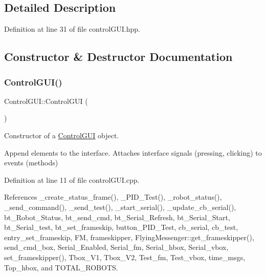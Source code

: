 \subsection{Detailed Description}


Definition at line 31 of file control\+G\+U\+I.\+hpp.



\subsection{Constructor \& Destructor Documentation}
\mbox{\label{class_control_g_u_i_a3ac837dec598621fcdd71fd64ff013fd}} 
\subsubsection{\texorpdfstring{Control\+G\+U\+I()}{ControlGUI()}}
{\footnotesize\ttfamily Control\+G\+U\+I\+::\+Control\+G\+UI (\begin{DoxyParamCaption}{ }\end{DoxyParamCaption})}



Constructor of a \hyperlink{class_control_g_u_i}{Control\+G\+UI} object. 

Append elements to the interface. Attaches interface signals (pressing, clicking) to events (methods) 

Definition at line 11 of file control\+G\+U\+I.\+cpp.



References \+\_\+create\+\_\+status\+\_\+frame(), \+\_\+\+P\+I\+D\+\_\+\+Test(), \+\_\+robot\+\_\+status(), \+\_\+send\+\_\+command(), \+\_\+send\+\_\+test(), \+\_\+start\+\_\+serial(), \+\_\+update\+\_\+cb\+\_\+serial(), bt\+\_\+\+Robot\+\_\+\+Status, bt\+\_\+send\+\_\+cmd, bt\+\_\+\+Serial\+\_\+\+Refresh, bt\+\_\+\+Serial\+\_\+\+Start, bt\+\_\+\+Serial\+\_\+test, bt\+\_\+set\+\_\+frameskip, button\+\_\+\+P\+I\+D\+\_\+\+Test, cb\+\_\+serial, cb\+\_\+test, entry\+\_\+set\+\_\+frameskip, FM, frameskipper, Flying\+Messenger\+::get\+\_\+frameskipper(), send\+\_\+cmd\+\_\+box, Serial\+\_\+\+Enabled, Serial\+\_\+fm, Serial\+\_\+hbox, Serial\+\_\+vbox, set\+\_\+frameskipper(), Tbox\+\_\+\+V1, Tbox\+\_\+\+V2, Test\+\_\+fm, Test\+\_\+vbox, time\+\_\+msgs, Top\+\_\+hbox, and T\+O\+T\+A\+L\+\_\+\+R\+O\+B\+O\+TS.


